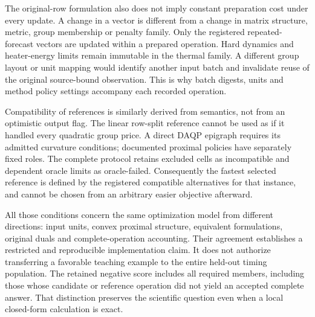 The original-row formulation also does not imply constant preparation
cost under every update. A change in a vector is different from a
change in matrix structure, metric, group membership or penalty family.
Only the registered repeated-forecast vectors are updated within a
prepared operation. Hard dynamics and heater-energy limits remain
immutable in the thermal family. A different group layout or unit
mapping would identify another input batch and invalidate reuse of
the original source-bound observation. This is why batch digests,
units and method policy settings accompany each recorded operation.

Compatibility of references is similarly derived from semantics, not
from an optimistic output flag. The linear row-split reference cannot
be used as if it handled every quadratic group price. A direct DAQP
epigraph requires its admitted curvature conditions; documented
proximal policies have separately fixed roles. The complete protocol
retains excluded cells as incompatible and dependent oracle limits
as oracle-failed. Consequently the fastest selected reference is
defined by the registered compatible alternatives for that instance,
and cannot be chosen from an arbitrary easier objective afterward.

All those conditions concern the same optimization model from
different directions: input units, convex proximal structure,
equivalent formulations, original duals and complete-operation
accounting. Their agreement establishes a restricted and reproducible
implementation claim. It does not authorize transferring a favorable
teaching example to the entire held-out timing population. The retained
negative score includes all required members, including those whose
candidate or reference operation did not yield an accepted complete
answer. That distinction preserves the scientific question even when
a local closed-form calculation is exact.
